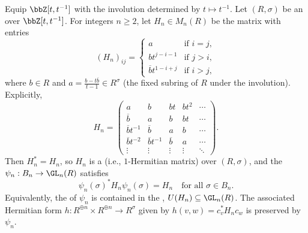 \begin{proposition} \label{proposition:hermitian_form_preserved_by_unreduced_burau_representation}
    Equip $\bbZ[t,t^{-1}]$ with the involution determined by $t \mapsto t^{-1}$. Let $(R,\sigma)$ be an  over $\bbZ[t,t^{-1}]$. For integers $n \geq 2$, let $H_n \in M_n(R)$ be the matrix with entries
    \begin{equation} \label{eq:hermitian_matrix_H_n}
        (H_n)_{ij} = \begin{cases}
            a & \text{if } i = j, \\
            b t^{j-i-1} & \text{if } j > i, \\
            \overline{b} t^{1-i+j} & \text{if } i > j,
        \end{cases}
    \end{equation}
    where $b \in R$ and $a = \frac{b - t\overline{b}}{t-1} \in R^{\sigma}$ (the fixed subring of $R$ under the involution). Explicitly,
    $$H_n = \begin{pmatrix}
        a & b & bt & bt^2 & \cdots \\
        \overline{b} & a & b & bt & \cdots \\
        \overline{b}t^{-1} & \overline{b} & a & b & \cdots \\
        \overline{b}t^{-2} & \overline{b}t^{-1} & \overline{b} & a & \cdots \\
        \vdots & \vdots & \vdots & \vdots & \ddots
    \end{pmatrix}.$$
    Then $H_n^* = H_n$, so $H_n$ is a  (i.e., $1$-Hermitian matrix) over $(R,\sigma)$, and the  $\psi_n: B_n \to \GL_n(R)$ satisfies
    $$\psi_n(\sigma)^* H_n \psi_n(\sigma) = H_n \quad \text{for all } \sigma \in B_n.$$
    Equivalently, the  of $\psi_n$ is contained in the , $U(H_n) \subseteq \GL_n(R)$. The associated Hermitian form $h: R^{\oplus n} \times R^{\oplus n} \to R^{\sigma}$ given by $h(v,w) = c_v^* H_n c_w$ is preserved by $\psi_n$.
\end{proposition}